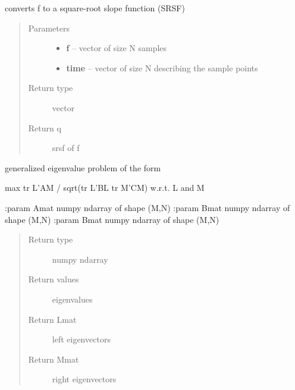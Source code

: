 \documentclass[letterpaper,10pt,english]{sphinxmanual}
\begin{document}

\begin{fulllineitems}
\label{utility_functions:utility_functions.f_to_srsf}
converts f to a square-root slope function (SRSF)
\begin{quote}\begin{description}
\item[{Parameters}] \leavevmode\begin{itemize}
\item {} 
\textbf{f} -- vector of size N samples

\item {} 
\textbf{time} -- vector of size N describing the sample points

\end{itemize}

\item[{Return type}] \leavevmode
vector

\item[{Return q}] \leavevmode
srsf of f

\end{description}\end{quote}

\end{fulllineitems}


\begin{fulllineitems}
\label{utility_functions:utility_functions.geigen}
generalized eigenvalue problem of the form

max tr L'AM / sqrt(tr L'BL tr M'CM) w.r.t. L and M

:param Amat numpy ndarray of shape (M,N)
:param Bmat numpy ndarray of shape (M,N)
:param Bmat numpy ndarray of shape (M,N)
\begin{quote}\begin{description}
\item[{Return type}] \leavevmode
numpy ndarray

\item[{Return values}] \leavevmode
eigenvalues

\item[{Return Lmat}] \leavevmode
left eigenvectors

\item[{Return Mmat}] \leavevmode
right eigenvectors

\end{description}\end{quote}

\end{fulllineitems}
\end{document}
